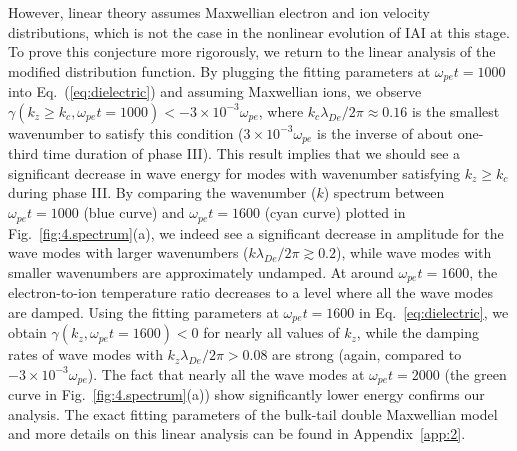 \documentclass[%
 reprint,
 amsmath,
 amssymb,
 aps,
 prx,
floatfix,
superscriptaddress
]{revtex4-2}
\begin{document}
However, linear theory assumes Maxwellian electron and ion velocity distributions, which is not the case in the nonlinear evolution of IAI at this stage.
To prove this conjecture more rigorously, we return to the linear analysis of the modified distribution function.
By plugging the fitting parameters at $\omega_{pe}t=1000$ into Eq.~(\ref{eq:dielectric}) and assuming Maxwellian ions, we observe $\gamma(k_z \geq k_c,\omega_{pe}t=1000) <  - 3 \times 10^{-3} \omega_{pe}$, where $k_c \lambda_{De}/2\pi \approx 0.16$ is the smallest wavenumber to satisfy this condition ($3 \times 10^{-3} \omega_{pe}$ is the inverse of about one-third time duration of phase III).
This result implies that we should see a significant decrease in wave energy for modes with wavenumber satisfying $k_z \geq k_c$ during phase III.
By comparing the wavenumber ($k$) spectrum between $\omega_{pe}t=1000$ (blue curve) and $\omega_{pe}t=1600$ (cyan curve) plotted in Fig.~\ref{fig:4.spectrum}(a), we indeed see a significant decrease in amplitude for the wave modes with larger wavenumbers ($k\lambda_{De}/2\pi \gtrsim 0.2$), while wave modes with smaller wavenumbers are approximately undamped.
At around $\omega_{pe}t=1600$, the electron-to-ion temperature ratio decreases to a level where all the wave modes are damped.
Using the fitting parameters at $\omega_{pe}t=1600$ in Eq.~\eqref{eq:dielectric}, we obtain $\gamma(k_z,\omega_{pe}t=1600) < 0$ for nearly all values of $k_z$, while the damping rates of wave modes with $k_z \lambda_{De}/2\pi > 0.08$ are strong (again, compared to $- 3\times 10^{-3}\omega_{pe}$).
The fact that nearly all the wave modes at $\omega_{pe}t=2000$ (the green curve in Fig.~\ref{fig:4.spectrum}(a)) show significantly lower energy confirms our analysis.
The exact fitting parameters of the bulk-tail double Maxwellian model and more details on this linear analysis can be found in Appendix~\ref{app:2}.
\end{document}
